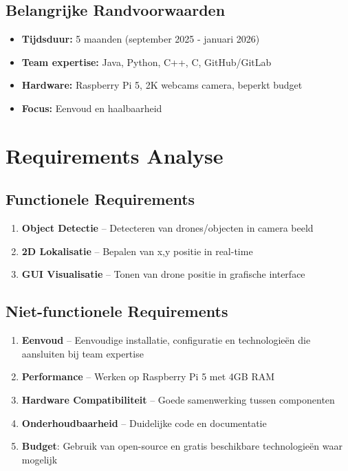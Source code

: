 \documentclass[11pt,a4paper]{scrartcl}
\begin{document}
\subsection{Belangrijke Randvoorwaarden}
\begin{itemize}[leftmargin=*]
    \item \textbf{Tijdsduur:} 5 maanden (september 2025 - januari 2026)
    \item \textbf{Team expertise:} Java, Python, C++, C, GitHub/GitLab
    \item \textbf{Hardware:} Raspberry Pi 5, 2K webcams camera, beperkt budget
    \item \textbf{Focus:} Eenvoud en haalbaarheid
    
\end{itemize}

\section{Requirements Analyse}

\subsection{Functionele Requirements}
\begin{enumerate}[leftmargin=*]
    \item \textbf{Object Detectie} -- Detecteren van drones/objecten in camera beeld
    \item \textbf{2D Lokalisatie} -- Bepalen van x,y positie in real-time
    \item \textbf{GUI Visualisatie} -- Tonen van drone positie in grafische interface

\end{enumerate}

\subsection{Niet-functionele Requirements}
\begin{enumerate}[leftmargin=*]
    \item \textbf{Eenvoud} -- Eenvoudige installatie, configuratie en technologieën die aansluiten bij team expertise
    \item \textbf{Performance} -- Werken op Raspberry Pi 5 met 4GB RAM
    \item \textbf{Hardware Compatibiliteit} -- Goede samenwerking tussen componenten
    \item \textbf{Onderhoudbaarheid} -- Duidelijke code en documentatie
    \item \textbf{Budget}: Gebruik van open-source en gratis beschikbare technologieën waar mogelijk
    
\end{enumerate}
\end{document}
